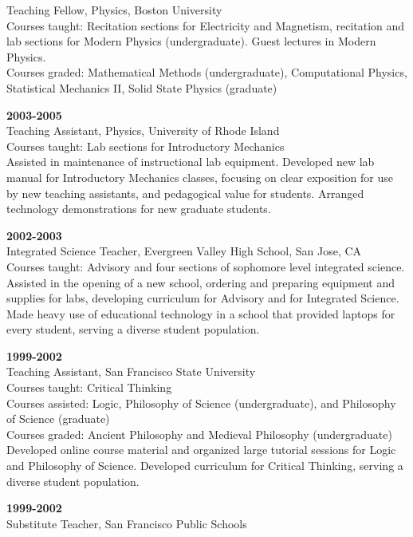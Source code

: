 \documentclass[letterpaper]{article}
\renewenvironment{itemize}{
  \begin{list}{}{
    \setlength{\leftmargin}{1.5em}
  }
}{
  \end{list}
}
\begin{document}
\begin{itemize}
	Teaching Fellow, Physics, Boston University \\  
	Courses taught: Recitation sections for Electricity and Magnetism, recitation and lab sections for Modern Physics (undergraduate). Guest lectures in Modern Physics.  \\
	Courses graded: Mathematical Methods (undergraduate), Computational Physics, Statistical Mechanics II, Solid State Physics (graduate)   
	\item \textbf{2003-2005}\\
	Teaching Assistant, Physics, University of Rhode Island \\  
	Courses taught: Lab sections for Introductory Mechanics   \\
	Assisted in maintenance of instructional lab equipment.  Developed new lab manual for Introductory Mechanics classes, focusing on clear exposition for use by new teaching assistants, and pedagogical value for students.  Arranged technology demonstrations for new graduate students. 
	\item \textbf{2002-2003}\\
	Integrated Science Teacher, Evergreen Valley High School, San Jose, CA  \\
	Courses taught: Advisory and four sections of sophomore level integrated science.\\  
	Assisted in the opening of a new school, ordering and preparing equipment and supplies for labs, developing curriculum for Advisory and for Integrated Science. Made heavy use of educational technology in a school that provided laptops for every student, serving a diverse student population.  
	\item \textbf{1999-2002} \\
	Teaching Assistant, San Francisco State University \\  
	Courses taught: Critical Thinking  \\
	Courses assisted: Logic, Philosophy of Science (undergraduate), and Philosophy of Science (graduate)  \\
	Courses graded: Ancient Philosophy and Medieval Philosophy (undergraduate) \\  
	Developed online course material and organized large tutorial sessions for Logic and Philosophy of Science.  Developed curriculum for Critical Thinking, serving a diverse student population.  
	\item \textbf{1999-2002} \\
	Substitute Teacher, San Francisco Public Schools \\  

\end{itemize}
\end{document}
